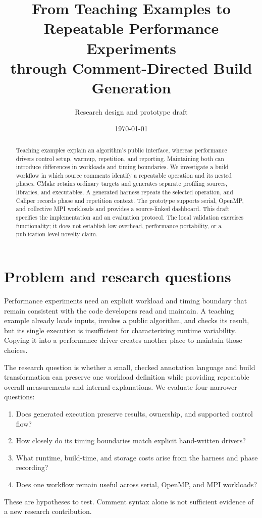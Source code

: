 \documentclass[10pt]{article}
\title{From Teaching Examples to Repeatable Performance Experiments\\
through Comment-Directed Build Generation}
\author{Research design and prototype draft}
\date{\today}
\begin{document}
\maketitle

\begin{abstract}
Teaching examples explain an algorithm's public interface, whereas performance
drivers control setup, warmup, repetition, and reporting. Maintaining both can
introduce differences in workloads and timing boundaries. We investigate a build
workflow in which source comments identify a repeatable operation and its nested
phases. CMake retains ordinary targets and generates separate profiling sources,
libraries, and executables. A generated harness repeats the selected operation,
and Caliper records phase and repetition context. The prototype supports serial,
OpenMP, and collective MPI workloads and provides a source-linked dashboard.
This draft specifies the implementation and an evaluation protocol. The local
validation exercises functionality; it does not establish low overhead,
performance portability, or a publication-level novelty claim.
\end{abstract}

\section{Problem and research questions}
Performance experiments need an explicit workload and timing boundary that remain
consistent with the code developers read and maintain. A teaching example already
loads inputs, invokes a public algorithm, and checks its result, but its single
execution is insufficient for characterizing runtime variability. Copying it into
a performance driver creates another place to maintain those choices.

The research question is whether a small, checked annotation language and build
transformation can preserve one workload definition while providing repeatable
overall measurements and internal explanations. We evaluate four narrower questions:
\begin{enumerate}
\item Does generated execution preserve results, ownership, and supported control flow?
\item How closely do its timing boundaries match explicit hand-written drivers?
\item What runtime, build-time, and storage costs arise from the harness and phase recording?
\item Does one workflow remain useful across serial, OpenMP, and MPI workloads?
\end{enumerate}
These are hypotheses to test. Comment syntax alone is not sufficient evidence of
a new research contribution.
\end{document}
